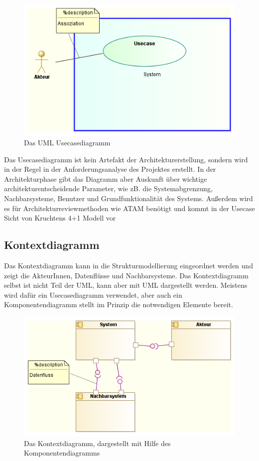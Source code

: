 \begin{figure}[H]
    \centering
    \includegraphics[scale=0.8]{uml/modelling/usecase.png}
    \caption{Das UML Usecasediagramm}
    \label{fig:umlusecasemodel}
\end{figure}

Das Usecasediagramm ist kein Artefakt der Architekturerstellung, sondern wird in der Regel in der Anforderungsanalyse des Projektes erstellt. In der Architekturphase gibt das Diagramm aber Auskunft über wichtige architekturentscheidende Parameter, wie zB. die Systemabgrenzung, Nachbarsysteme, Benutzer und Grundfunktionalität des Systems. Außerdem wird es für Architekturreviewmethoden wie ATAM benötigt und kommt in der Usecase Sicht von Kruchtens 4+1 Modell vor \cite[S. 148]{basiswissen}

\subsection{Kontextdiagramm}
Das Kontextdiagramm kann in die Strukturmodellierung eingeordnet werden und zeigt die AkteurInnen, Datenflüsse und Nachbarsysteme. Das Kontextdiagramm selbst ist nicht Teil der UML, kann aber mit UML dargestellt werden. Meistens wird dafür ein Usecasediagramm verwendet, aber auch ein Komponentendiagramm stellt im Prinzip die notwendigen Elemente bereit. \cite[S. 255]{glasklar}

\begin{figure}[H]
    \centering
    \includegraphics[scale=0.8]{uml/modelling/context.png}
    \caption{Das Kontextdiagramm, dargestellt mit Hilfe des Komponentendiagramms}
    \label{fig:umlcontextmodel}
\end{figure}

